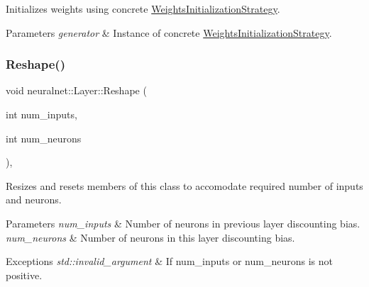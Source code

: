 Initializes weights using concrete \hyperlink{classneuralnet_1_1WeightsInitializationStrategy}{Weights\+Initialization\+Strategy}. 


\begin{DoxyParams}{Parameters}
{\em generator} & Instance of concrete \hyperlink{classneuralnet_1_1WeightsInitializationStrategy}{Weights\+Initialization\+Strategy}. \\
\hline
\end{DoxyParams}
\mbox{\label{classneuralnet_1_1Layer_a6482cc828fd4b3e913b382b0141817c4}} 
\subsubsection{\texorpdfstring{Reshape()}{Reshape()}}
{\footnotesize\ttfamily void neuralnet\+::\+Layer\+::\+Reshape (\begin{DoxyParamCaption}\item[{int}]{num\+\_\+inputs,  }\item[{int}]{num\+\_\+neurons }\end{DoxyParamCaption})\hspace{0.3cm}{\ttfamily [protected]}, {\ttfamily [virtual]}}



Resizes and resets members of this class to accomodate required number of inputs and neurons. 


\begin{DoxyParams}{Parameters}
{\em num\+\_\+inputs} & Number of neurons in previous layer discounting bias. \\
\hline
{\em num\+\_\+neurons} & Number of neurons in this layer discounting bias. \\
\hline
\end{DoxyParams}

\begin{DoxyExceptions}{Exceptions}
{\em std\+::invalid\+\_\+argument} & If num\+\_\+inputs or num\+\_\+neurons is not positive. \\
\hline
\end{DoxyExceptions}
\mbox{\label{classneuralnet_1_1Layer_a98d81c554f666307c6387c9a86bb1bea}} 
